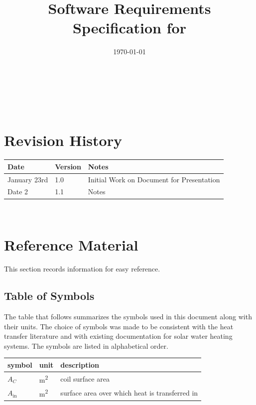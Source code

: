 \documentclass[12pt]{article}
\begin{document}
\title{Software Requirements Specification for \progname} 
\author{\authname}
\date{\today}
	
\maketitle

~\newpage


\tableofcontents

~\newpage

\section*{Revision History}

\begin{tabularx}{\textwidth}{p{3cm}p{2cm}X}
\toprule {\bf Date} & {\bf Version} & {\bf Notes}\\
\midrule
January 23rd & 1.0 & Initial Work on Document for Presentation\\
Date 2 & 1.1 & Notes\\
\bottomrule
\end{tabularx}

~\newpage

\section{Reference Material}

This section records information for easy reference.

\subsection{Table of Symbols}

The table that follows summarizes the symbols used in this document along with
their units.  The choice of symbols was made to be consistent with the heat
transfer literature and with existing documentation for solar water heating
systems.  The symbols are listed in alphabetical order.

\renewcommand{\arraystretch}{1.2}
\noindent \begin{longtable*}{l l p{12cm}} \toprule
\textbf{symbol} & \textbf{unit} & \textbf{description}\\
\midrule 
$A_C$ & \si[per-mode=symbol] {\square\metre} & coil surface area
\\
$A_\text{in}$ & \si[per-mode=symbol] {\square\metre} & surface area over 
which heat is transferred in
\\ 
\bottomrule
\end{longtable*}
\end{document}
